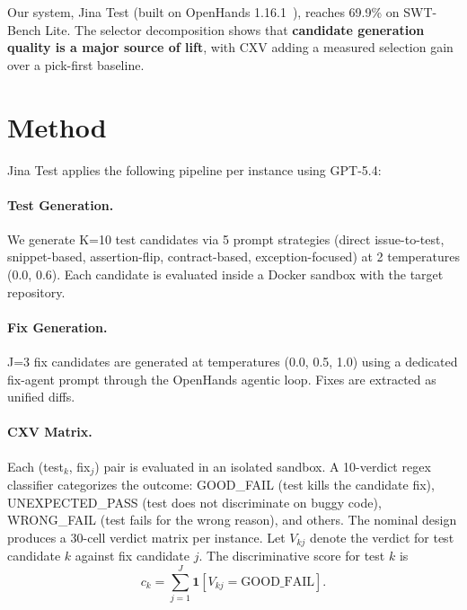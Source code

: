 \documentclass{article}
\begin{document}
Our system, Jina Test (built on OpenHands 1.16.1~\cite{wang2024openhands}), reaches 69.9\% on SWT-Bench Lite. The selector decomposition shows that \textbf{candidate generation quality is a major source of lift}, with CXV adding a measured selection gain over a pick-first baseline.

\section{Method}

Jina Test applies the following pipeline per instance using GPT-5.4:

\begin{center}
\end{center}

\paragraph{Test Generation.} We generate K=10 test candidates via 5 prompt strategies (direct issue-to-test, snippet-based, assertion-flip, contract-based, exception-focused) at 2 temperatures (0.0, 0.6). Each candidate is evaluated inside a Docker sandbox with the target repository.

\paragraph{Fix Generation.} J=3 fix candidates are generated at temperatures (0.0, 0.5, 1.0) using a dedicated fix-agent prompt through the OpenHands agentic loop. Fixes are extracted as unified diffs.

\paragraph{CXV Matrix.} Each (test$_k$, fix$_j$) pair is evaluated in an isolated sandbox. A 10-verdict regex classifier categorizes the outcome: GOOD\_FAIL (test kills the candidate fix), UNEXPECTED\_PASS (test does not discriminate on buggy code), WRONG\_FAIL (test fails for the wrong reason), and others. The nominal design produces a 30-cell verdict matrix per instance. Let $V_{kj}$ denote the verdict for test candidate $k$ against fix candidate $j$. The discriminative score for test $k$ is
\[
c_k=\sum_{j=1}^{J}\mathbf{1}[V_{kj}=\mathrm{GOOD\_FAIL}].
\]
\end{document}
